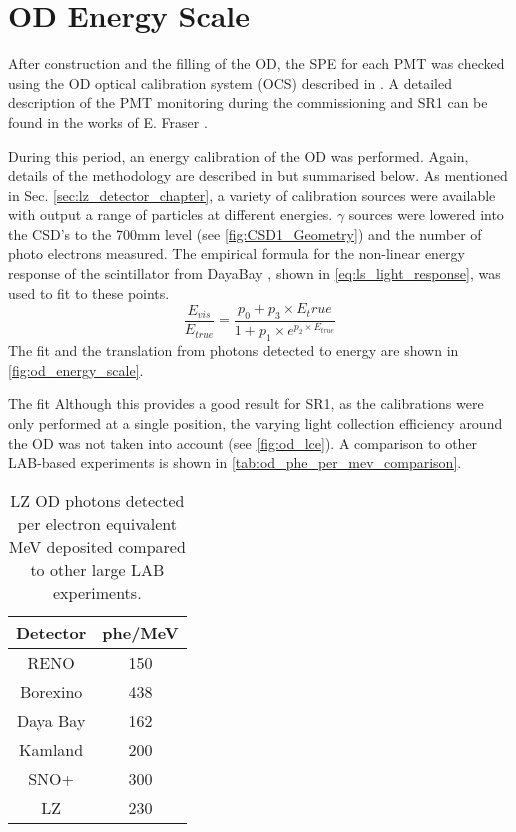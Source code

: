 \section{OD Energy Scale} \label{sec:od_energy_scale}
\par
After construction and the filling of the OD, the SPE for each PMT was checked using the OD optical calibration system (OCS) described in \cite{lz_ocs_system_ref}.
A detailed description of the PMT monitoring during the commissioning and SR1 can be found in the works of E. Fraser \cite{ewanfraser_thesis_ref}. 
\par
During this period, an energy calibration of the OD was performed.
Again, details of the methodology are described in \cite{ewanfraser_thesis_ref} but summarised below.
As mentioned in Sec. \ref{sec:lz_detector_chapter}, a variety of calibration sources were available with output a range of particles at different energies.
$\gamma$ sources were lowered into the CSD's to the 700mm level (see \autoref{fig:CSD1_Geometry}) and the number of photo electrons measured.
The empirical formula for the non-linear energy response of the scintillator from DayaBay \cite{dayabay_antineutrino_oscillation_ref, ls_nonlinear_energy_response_ref}, shown in \autoref{eq:ls_light_response}, was used to fit to these points.
\begin{equation}
    \frac{E_{vis}}{E_{true}} = \frac{p_0  + p_3 \times E_true}{1 + p_1 \times e^{p_2 \times E_{true}}}
    \label{eq:ls_light_response}
\end{equation}
The fit and the translation from photons detected to energy are shown in \autoref{fig:od_energy_scale}.



\par
The fit 
Although this provides a good result for SR1, as the calibrations were only performed at a single position, the varying light collection efficiency around the OD was not taken into account (see \autoref{fig:od_lce}).
A comparison to other LAB-based experiments is shown in \autoref{tab:od_phe_per_mev_comparison}.

\begin{table}[!htbp]%
    \centering
    \begin{tabular}{c|c}
        Detector & phe/MeV \\ \hline
        RENO     & 150 \cite{reno_phe_per_mev_ref} \\
        Borexino & 438 \cite{pablo_mosteiro_thesis_ref} \\
        Daya Bay & 162 \cite{dayabay_phe_per_mev_ref} \\
        Kamland  & 200 \cite{kamland_phe_per_mev_ref} \\
        SNO+     & 300 \cite{snoplus_phe_per_mev_ref} \\
        LZ       & 230 
    \end{tabular}
    \caption{LZ OD photons detected per electron equivalent MeV deposited compared to other large LAB experiments.}
    \label{tab:od_phe_per_mev_comparison}
\end{table}

